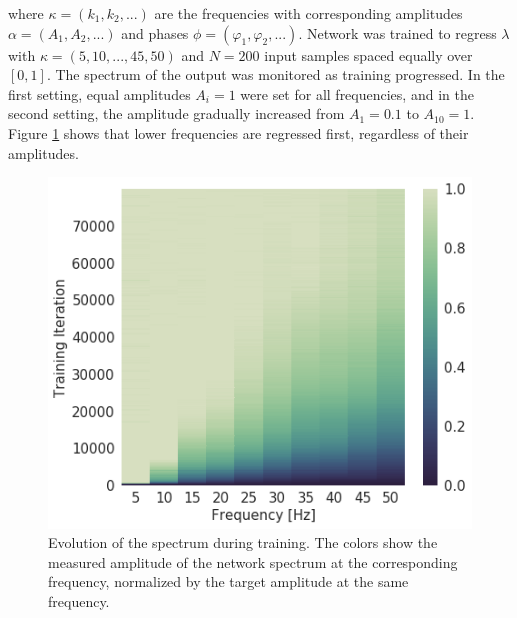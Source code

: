 \noindent where $\kappa = (k_1, k_2, ...)$ are the frequencies with corresponding amplitudes $\alpha = (A_1, A_2, ...)$ and phases $\phi = (\varphi_1, \varphi_2, ...)$. Network was trained to regress $\lambda$ with $\kappa = (5, 10, ..., 45, 50)$ and $N=200$ input samples spaced equally over $[0, 1]$. The spectrum of the output was monitored as training progressed. In the first setting, equal amplitudes $A_i = 1$ were set for all frequencies, and in the second setting, the amplitude gradually increased from $A_1 = 0.1$ to $A_{10} = 1$. Figure \ref{fig:spectralbias_experiment_1} shows that lower frequencies are regressed first, regardless of their amplitudes. \cite{spectralbias}

\begin{figure}[ht]
    \centering
    \begin{subcaptionblock}[t]{.475\textwidth}
        \centering
        \includegraphics[height=0.9\textwidth]{images/experiment_1.png}
        \caption[Experiment showcasing spectralbias]{\label{fig:spectralbias_experiment_1}Evolution of the spectrum during training. The colors show the measured amplitude of the network spectrum at the corresponding frequency, normalized by the target amplitude at the same frequency. \cite{spectralbias}}
    \end{subcaptionblock}
    \hspace{1em}
    \begin{subcaptionblock}[t]{.475\textwidth}
        \centering

\end{subcaptionblock}
\end{figure}

